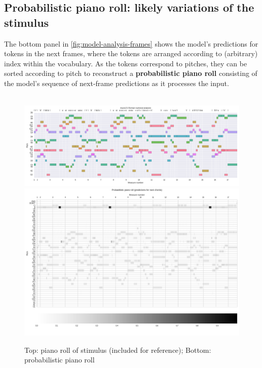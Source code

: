\documentclass[dissertation.tex]{subfiles}
\begin{document}
\subsection{Probabilistic piano roll: likely variations of the stimulus}

The bottom panel in \cref{fig:model-analysis-frames} shows the model's predictions
for tokens in the next frames, where the tokens are arranged according to (arbitrary)
index within the vocabulary. As the tokens correspond to pitches, they can be sorted
according to pitch to reconstruct a {\bf probabilistic piano roll}\cite{eck2008learning}
consisting of the model's sequence of next-frame predictions as it processes the input.

\begin{figure}[htpb]
    \centering
    ~~\includegraphics[width=0.99\linewidth]{Figures/model-analysis-input-piano-roll.png}
    \includegraphics[trim={0 0 0 1.4cm},clip,width=1.0\linewidth]{Figures/model-analysis-probabilistic-piano-roll.png}
    \caption{Top: piano roll of stimulus (included for reference); Bottom: probabilistic piano roll}
    \label{fig:model-analysis-probabilistic-piano-roll}
\end{figure}
\end{document}
